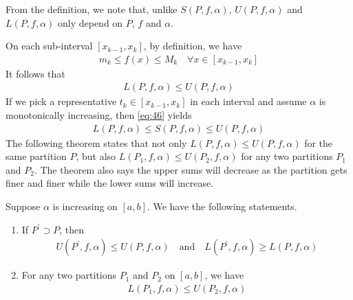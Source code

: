 \documentclass[thmcnt=section, 12pt]{my-elegantbook}
\begin{document}
\begin{note}
    From the definition, we note that, unlike $S(P,f,\alpha)$, $U(P,f,\alpha)$ and $L(P,f,\alpha)$ only depend on $P$, $f$ and $\alpha$.
\end{note}

On each sub-interval $[x_{k-1}, x_k]$, by definition, we have 
\begin{align}
    m_k \leq f(x) \leq M_k
    \quad \forall x \in [x_{k-1}, x_k]
    \label{eq:46}
\end{align}
It follows that 
\begin{align}
    L(P,f,\alpha) \leq U(P,f,\alpha)
    \label{eq:45}
\end{align}
If we pick a representative $t_k \in [x_{k-1}, x_k]$ in each interval and assume $\alpha$ is monotonically increasing, then \eqref{eq:46} yields
\begin{align*}
    L(P,f,\alpha) \leq S(P,f,\alpha) \leq U(P,f,\alpha)
\end{align*}
The following theorem states that not only $L(P,f,\alpha) \leq U(P,f,\alpha)$ for the same partition $P$, but also $L(P_1,f,\alpha) \leq U(P_2,f,\alpha)$ for any two partitions $P_1$ and $P_2$. The theorem also says the upper sums will decrease as the partition gets finer and finer while the lower sums will increase.

\begin{theorem} \label{thm:26}
    Suppose $\alpha$ is increasing on $[a, b]$. We have the following statements.
    \begin{enumerate}
        \item If $P^\prime \supset P$, then 
        \begin{align*}
            U(P^\prime,f,\alpha) \leq U(P,f,\alpha)
            \quad\text{and}\quad
            L(P^\prime,f,\alpha) \geq L(P,f,\alpha)
        \end{align*}
        \item For any two partitions $P_1$ and $P_2$ on $[a, b]$, we have 
        \begin{align*}
            L(P_1, f, \alpha) \leq U(P_2, f, \alpha)
        \end{align*}
    \end{enumerate}
\end{theorem}
\end{document}
